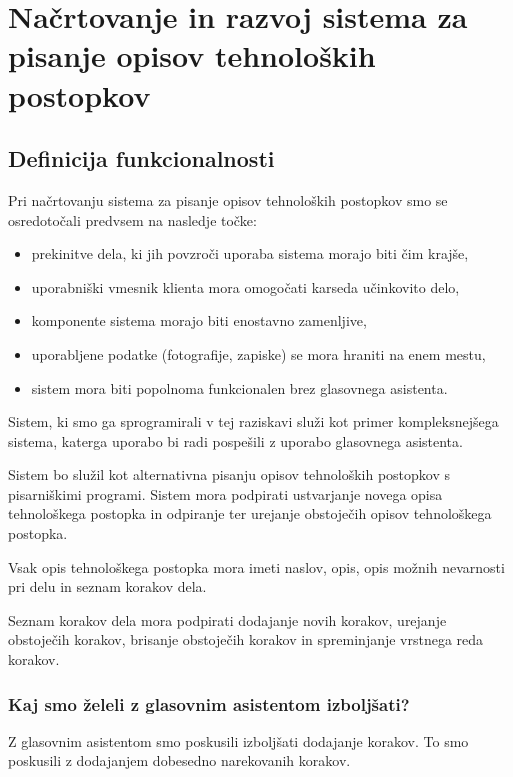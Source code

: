 \documentclass[a4paper, 12pt]{book}
\begin{document}
\chapter{Načrtovanje in razvoj sistema za pisanje opisov tehnoloških postopkov}

\section{Definicija funkcionalnosti}

Pri načrtovanju sistema za pisanje opisov tehnoloških postopkov smo se osredotočali predvsem na nasledje točke:
\begin{itemize}
	\item prekinitve dela, ki jih povzroči uporaba sistema morajo biti čim krajše,
	\item uporabniški vmesnik klienta mora omogočati karseda učinkovito delo,
	\item komponente sistema morajo biti enostavno zamenljive,
	\item uporabljene podatke (fotografije, zapiske) se mora hraniti na enem mestu,
	\item sistem mora biti popolnoma funkcionalen brez glasovnega asistenta.
\end{itemize}

Sistem, ki smo ga sprogramirali v tej raziskavi služi kot primer kompleksnejšega sistema, katerga uporabo bi radi pospešili z uporabo glasovnega asistenta.

Sistem bo služil kot alternativna pisanju opisov tehnoloških postopkov s pisarniškimi programi.
Sistem mora podpirati ustvarjanje novega opisa tehnološkega postopka in odpiranje ter urejanje obstoječih opisov tehnološkega postopka.

Vsak opis tehnološkega postopka mora imeti naslov, opis, opis možnih nevarnosti pri delu in seznam korakov dela.

Seznam korakov dela mora podpirati dodajanje novih korakov, urejanje obstoječih korakov, brisanje obstoječih korakov in spreminjanje vrstnega reda korakov.

\subsection{Kaj smo želeli z glasovnim asistentom izboljšati?}

Z glasovnim asistentom smo poskusili izboljšati dodajanje korakov.
To smo poskusili z dodajanjem dobesedno narekovanih korakov.
\end{document}
